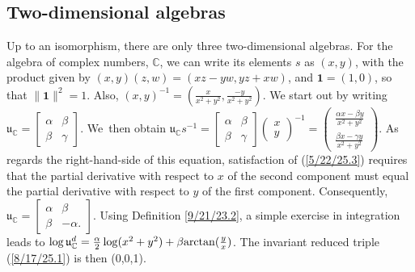 \documentclass{amsart}
\theoremstyle{definition}
\numberwithin{theorem}{section}
\numberwithin{equation}{section}
\begin{document}
\subsection{Two-dimensional algebras}
Up to an isomorphism, there are only three two-dimensional algebras.
For the algebra of complex numbers, $\mathbb{C}$, we can write its elements $s$ as $(x,y)$, with the product given by $(x,y)(z,w) = (xz-yw, yz+xw)$, and $\mathbf{1}=(1,0)$, so that $\|\mathbf{1}\|^2=1$.  Also, $(x,y)^{-1} = (\frac{x}{x^2+y^2},\frac{-y}{x^2+y^2})$.  We start out by writing  $\mathfrak{u}_\mathbb{C} = \left[\begin{array}{ccc}
 \alpha & \beta   \\ 
 \beta & \gamma    
\end{array}\right]$.  \mbox{We then} obtain  $\mathfrak{u}_\mathbb{C}s^{-1} = \left[\begin{array}{ccc}
 \alpha & \beta   \\ 
 \beta & \gamma    
\end{array}\right]\left(\begin{array}{ccc}
x   \\ 
y   
\end{array}\right)^{-1} = \left(\begin{array}{ccc}
\frac{\alpha x - \beta y}{x^2+y^2}  \\ 
\frac{\beta x - \gamma y}{x^2+y^2} 
\end{array}\right)$.  As regards the right-hand-side of this equation, satisfaction of (\ref{5/22/25.3}) requires that the partial derivative with respect to $x$ of the second component must equal the partial derivative with respect to $y$ of the first component.  Consequently, $\mathfrak{u}_{\mathbb{C}} = \left[\begin{array}{ccc}
 \alpha & \beta   \\ 
 \beta & -\alpha.   
\end{array}\right]$.  Using Definition \ref{9/21/23.2}, a simple exercise in integration leads to $\log  \mathfrak{u}^d_{\mathbb{C}} = \frac{\alpha}{2}\log(x^2+y^2) + \beta{\rm arctan}(\frac{y}{x})$.   The invariant reduced triple (\ref{8/17/25.1}) is then (0,0,1).
\end{document}
